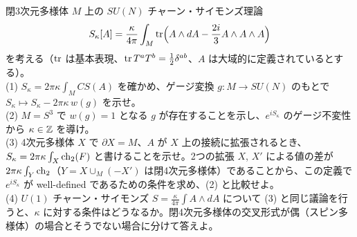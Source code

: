 \begin{problem}[難易度 D]\label{ch08-prob-cslevel}
閉3次元多様体 $M$ 上の $SU(N)$ チャーン・サイモンズ理論
\[
S_\kappa[A]=\frac{\kappa}{4\pi}\int_M\tr\Bigl(A\wedge dA-\frac{2i}{3}A\wedge A\wedge A\Bigr)
\]
を考える（$\tr$ は基本表現、$\tr T^aT^b=\frac12\delta^{ab}$、$A$ は大域的に定義されているとする）。\\
(1) $S_\kappa=2\pi\kappa\int_MCS(A)$ を確かめ、ゲージ変換 $g\colon M\to SU(N)$ のもとで $S_\kappa\mapsto S_\kappa-2\pi\kappa\,w(g)$ を示せ。\\
(2) $M=S^3$ で $w(g)=1$ となる $g$ が存在することを示し、$e^{iS_\kappa}$ のゲージ不変性から $\kappa\in\mathbb{Z}$ を導け。\\
(3) 4次元多様体 $X$ で $\partial X=M$、$A$ が $X$ 上の接続に拡張されるとき、$S_\kappa=2\pi\kappa\int_X\operatorname{ch}_2(F)$ と書けることを示せ。2つの拡張 $X$, $X'$ による値の差が $2\pi\kappa\int_{Y}\operatorname{ch}_2$（$Y=X\cup_M(-X')$ は閉4次元多様体）であることから、この定義で $e^{iS_\kappa}$ が well-defined であるための条件を求め、(2) と比較せよ。\\
(4) $U(1)$ チャーン・サイモンズ $S=\frac{\kappa}{4\pi}\int A\wedge dA$ について (3) と同じ議論を行うと、$\kappa$ に対する条件はどうなるか。閉4次元多様体の交叉形式が偶（スピン多様体）の場合とそうでない場合に分けて答えよ。
\end{problem}

